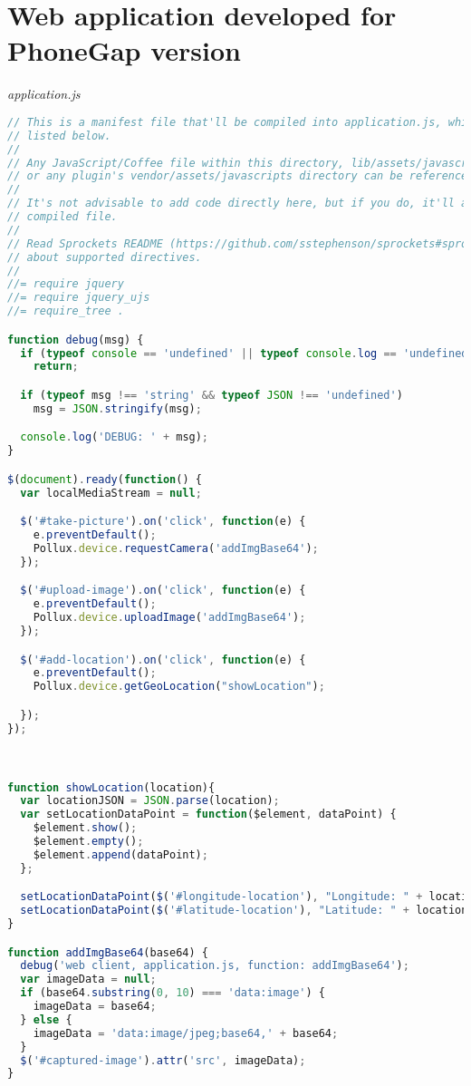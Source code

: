 \section{Web application developed for PhoneGap version} \label{App:AppendixD}
\emph{application.js}
\begin{lstlisting}[language=JavaScript]
// This is a manifest file that'll be compiled into application.js, which will include all the files
// listed below.
//
// Any JavaScript/Coffee file within this directory, lib/assets/javascripts, vendor/assets/javascripts,
// or any plugin's vendor/assets/javascripts directory can be referenced here using a relative path.
//
// It's not advisable to add code directly here, but if you do, it'll appear at the bottom of the
// compiled file.
//
// Read Sprockets README (https://github.com/sstephenson/sprockets#sprockets-directives) for details
// about supported directives.
//
//= require jquery
//= require jquery_ujs
//= require_tree .

function debug(msg) {
  if (typeof console == 'undefined' || typeof console.log == 'undefined')
    return;

  if (typeof msg !== 'string' && typeof JSON !== 'undefined')
    msg = JSON.stringify(msg);

  console.log('DEBUG: ' + msg);
}

$(document).ready(function() {
  var localMediaStream = null;

  $('#take-picture').on('click', function(e) {
    e.preventDefault();
    Pollux.device.requestCamera('addImgBase64');
  });

  $('#upload-image').on('click', function(e) {
    e.preventDefault();
    Pollux.device.uploadImage('addImgBase64');
  });

  $('#add-location').on('click', function(e) {
    e.preventDefault();
    Pollux.device.getGeoLocation("showLocation");

  });
});



function showLocation(location){
  var locationJSON = JSON.parse(location);
  var setLocationDataPoint = function($element, dataPoint) {
    $element.show();
    $element.empty();
    $element.append(dataPoint);
  };

  setLocationDataPoint($('#longitude-location'), "Longitude: " + locationJSON.longitude);
  setLocationDataPoint($('#latitude-location'), "Latitude: " + locationJSON.latitude);
}

function addImgBase64(base64) {
  debug('web client, application.js, function: addImgBase64');
  var imageData = null;
  if (base64.substring(0, 10) === 'data:image') {
    imageData = base64;
  } else {
    imageData = 'data:image/jpeg;base64,' + base64;
  }
  $('#captured-image').attr('src', imageData);
}
\end{lstlisting}
